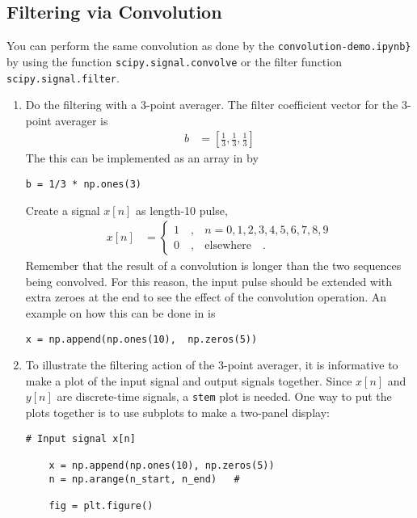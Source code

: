 \subsection{Filtering via Convolution}  \label{fir-convolution}
You can perform the same convolution as done by the \verb|convolution-demo.ipynb}|  by using the \scipy function
\verb|scipy.signal.convolve| or the filter function \verb|scipy.signal.filter|.
\begin{enumerate}[1)]
	\item Do the filtering with a 3-point averager. The filter coefficient vector for
	the 3-point averager is
	\begin{align}
		b &= [ \tfrac{1}{3} , \tfrac{1}{3} , \tfrac{1}{3} ]
		\label{eq:3-pt-average}
	\end{align}
	The this can be implemented as an array in  \numpy by 
	
	\begin{lstlisting}[style=pythonstyle]
	b = 1/3 * np.ones(3)
	\end{lstlisting}
	Create a signal $x[n]$ as length-10 pulse, 
	\begin{align}
		x[n] &= \begin{cases}
			1 \quad , & n= 0, 1, 2, 3, 4, 5, 6, 7, 8, 9  \\
			0 \quad , & \text{elsewhere} \quad .
		\end{cases}		
	\end{align}
	Remember that the result of a convolution is longer than the two sequences  being convolved. For this reason, the input pulse should be extended with extra zeroes at the end to see the effect of the convolution operation. An example on how this can be done in \numpy is 
	\begin{lstlisting}[style=pythonstyle]
	x = np.append(np.ones(10),  np.zeros(5))
	\end{lstlisting}
	
	\item To illustrate the filtering action of the 3-point averager, it is informative to make a plot of the input
	signal and output signals together. Since $x[n]$ and $y[n]$ are discrete-time signals, a \verb|stem| plot is
	needed. 
	One way to put the plots together is to use subplots to make a two-panel display:
	\begin{lstlisting}[style=pythonstyle]
	# Input signal x[n]

	x = np.append(np.ones(10), np.zeros(5))
	n = np.arange(n_start, n_end)   #
	
	fig = plt.figure()
	

\end{lstlisting}
\end{enumerate}
